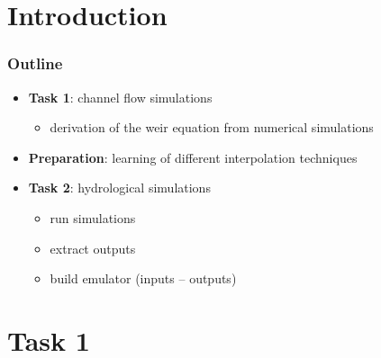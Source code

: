 \documentclass[xcolor=dvipsnames, USenglish]{beamer}  %
\begin{document}
\section{Introduction}

  \begin{frame}
    \frametitle{Outline}
    \begin{itemize}
      \item \textbf{Task 1}: channel flow simulations
        \begin{itemize} 
          \item derivation of the weir equation from numerical simulations
        \end{itemize}
      \item \textbf{Preparation}: learning of different interpolation techniques
      \item \textbf{Task 2}: hydrological simulations
        \begin{itemize}
          \item run simulations
          \item extract outputs
          \item build emulator (inputs -- outputs)
        \end{itemize}
     \end{itemize}
  \end{frame}


\section{Task 1}
\end{document}

